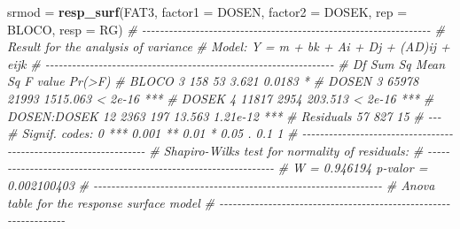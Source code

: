 \documentclass[
]{book}
\newenvironment{Shaded}{\begin{snugshade}}{\end{snugshade}}
\newcommand{\CommentTok}[1]{\textcolor[rgb]{0.56,0.35,0.01}{\textit{#1}}}
\newcommand{\DataTypeTok}[1]{\textcolor[rgb]{0.13,0.29,0.53}{#1}}
\newcommand{\KeywordTok}[1]{\textcolor[rgb]{0.13,0.29,0.53}{\textbf{#1}}}
\newcommand{\NormalTok}[1]{#1}
\newcommand{\StringTok}[1]{\textcolor[rgb]{0.31,0.60,0.02}{#1}}
\numberwithin{equation}{section}
\begin{document}
\begin{Shaded}
\begin{Highlighting}[]
\NormalTok{srmod =}\StringTok{  }\KeywordTok{resp\_surf}\NormalTok{(FAT3,}
                   \DataTypeTok{factor1 =}\NormalTok{ DOSEN,}
                   \DataTypeTok{factor2 =}\NormalTok{ DOSEK,}
                   \DataTypeTok{rep =}\NormalTok{ BLOCO,}
                   \DataTypeTok{resp =}\NormalTok{ RG)}
\CommentTok{\# {-}{-}{-}{-}{-}{-}{-}{-}{-}{-}{-}{-}{-}{-}{-}{-}{-}{-}{-}{-}{-}{-}{-}{-}{-}{-}{-}{-}{-}{-}{-}{-}{-}{-}{-}{-}{-}{-}{-}{-}{-}{-}{-}{-}{-}{-}{-}{-}{-}{-}{-}{-}{-}{-}{-}{-}{-}{-}{-}{-}{-}{-}{-}{-}{-}}
\CommentTok{\# Result for the analysis of variance }
\CommentTok{\# Model: Y = m + bk + Ai + Dj + (AD)ij + eijk }
\CommentTok{\# {-}{-}{-}{-}{-}{-}{-}{-}{-}{-}{-}{-}{-}{-}{-}{-}{-}{-}{-}{-}{-}{-}{-}{-}{-}{-}{-}{-}{-}{-}{-}{-}{-}{-}{-}{-}{-}{-}{-}{-}{-}{-}{-}{-}{-}{-}{-}{-}{-}{-}{-}{-}{-}{-}{-}{-}{-}{-}{-}{-}{-}{-}{-}{-}{-}}
\CommentTok{\#             Df Sum Sq Mean Sq  F value   Pr(\textgreater{}F)    }
\CommentTok{\# BLOCO        3    158      53    3.621   0.0183 *  }
\CommentTok{\# DOSEN        3  65978   21993 1515.063  \textless{} 2e{-}16 ***}
\CommentTok{\# DOSEK        4  11817    2954  203.513  \textless{} 2e{-}16 ***}
\CommentTok{\# DOSEN:DOSEK 12   2363     197   13.563 1.21e{-}12 ***}
\CommentTok{\# Residuals   57    827      15                      }
\CommentTok{\# {-}{-}{-}}
\CommentTok{\# Signif. codes:  0 \textquotesingle{}***\textquotesingle{} 0.001 \textquotesingle{}**\textquotesingle{} 0.01 \textquotesingle{}*\textquotesingle{} 0.05 \textquotesingle{}.\textquotesingle{} 0.1 \textquotesingle{} \textquotesingle{} 1}
\CommentTok{\# {-}{-}{-}{-}{-}{-}{-}{-}{-}{-}{-}{-}{-}{-}{-}{-}{-}{-}{-}{-}{-}{-}{-}{-}{-}{-}{-}{-}{-}{-}{-}{-}{-}{-}{-}{-}{-}{-}{-}{-}{-}{-}{-}{-}{-}{-}{-}{-}{-}{-}{-}{-}{-}{-}{-}{-}{-}{-}{-}{-}{-}{-}{-}{-}{-}}
\CommentTok{\# Shapiro{-}Wilk\textquotesingle{}s test for normality of residuals: }
\CommentTok{\# {-}{-}{-}{-}{-}{-}{-}{-}{-}{-}{-}{-}{-}{-}{-}{-}{-}{-}{-}{-}{-}{-}{-}{-}{-}{-}{-}{-}{-}{-}{-}{-}{-}{-}{-}{-}{-}{-}{-}{-}{-}{-}{-}{-}{-}{-}{-}{-}{-}{-}{-}{-}{-}{-}{-}{-}{-}{-}{-}{-}{-}{-}{-}{-}{-}}
\CommentTok{\# W =  0.946194 p{-}valor =  0.002100403 }
\CommentTok{\# {-}{-}{-}{-}{-}{-}{-}{-}{-}{-}{-}{-}{-}{-}{-}{-}{-}{-}{-}{-}{-}{-}{-}{-}{-}{-}{-}{-}{-}{-}{-}{-}{-}{-}{-}{-}{-}{-}{-}{-}{-}{-}{-}{-}{-}{-}{-}{-}{-}{-}{-}{-}{-}{-}{-}{-}{-}{-}{-}{-}{-}{-}{-}{-}{-}}
\CommentTok{\# Anova table for the response surface model }
\CommentTok{\# {-}{-}{-}{-}{-}{-}{-}{-}{-}{-}{-}{-}{-}{-}{-}{-}{-}{-}{-}{-}{-}{-}{-}{-}{-}{-}{-}{-}{-}{-}{-}{-}{-}{-}{-}{-}{-}{-}{-}{-}{-}{-}{-}{-}{-}{-}{-}{-}{-}{-}{-}{-}{-}{-}{-}{-}{-}{-}{-}{-}{-}{-}{-}{-}{-}}

\end{Highlighting}
\end{Shaded}
\end{document}
